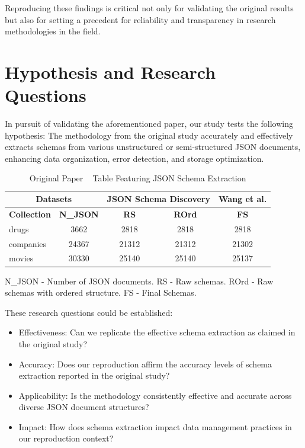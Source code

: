 \documentclass[sigconf, nonacm]{acmart}
\begin{document}
Reproducing these findings is critical not only for validating the original results but also for setting a precedent for reliability and transparency in research methodologies in the field.


\section{Hypothesis and Research Questions}

In pursuit of validating the aforementioned paper, our study tests the following hypothesis: The methodology from the original study accurately and effectively extracts schemas from various unstructured or semi-structured JSON documents, enhancing data organization, error detection, and storage optimization.

\begin{table}[h!]
\centering
\caption{Original Paper ~\cite{JsonSchemaDiscovery} Table Featuring JSON Schema Extraction}
\label{tab:original-table}
\begin{footnotesize}
\begin{tabular}{|l|c|c|c|c|}
\hline
\multicolumn{2}{|c|}{\textbf{Datasets}} & \multicolumn{2}{c|}{\textbf{JSON Schema Discovery}} & \textbf{Wang et al.} \cite{WangSchemaManagement}\\
\hline
\textbf{Collection} & \textbf{N\_JSON} & \textbf{RS} & \textbf{ROrd} & \textbf{FS} \\
\hline
drugs & 3662 & 2818 & 2818 & 2818 \\
\hline 
companies & 24367 & 21312 & 21312 & 21302 \\
\hline
movies & 30330 & 25140 & 25140 & 25137 \\
\hline
\end{tabular}
\end{footnotesize}
\smallskip
\footnotesize{N\_JSON - Number of JSON documents. RS - Raw schemas. ROrd - Raw schemas with ordered structure. FS - Final Schemas.}
\end{table}

These research questions could be established:
\begin{itemize}
    \item Effectiveness: Can we replicate the effective schema extraction as claimed in the original study?
    \item Accuracy: Does our reproduction affirm the accuracy levels of schema extraction reported in the original study?
    \item Applicability: Is the methodology consistently effective and accurate across diverse JSON document structures?
    \item Impact: How does schema extraction impact data management practices in our reproduction context?
\end{itemize}
\end{document}
